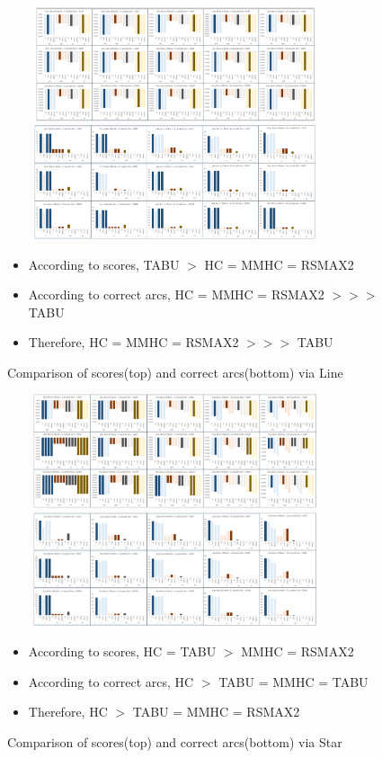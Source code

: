 \documentclass[runningheads,a4paper]{llncs}
\begin{document}
	\begin{figure}
		\centering
		\includegraphics[width=280pt, height=95pt]{images/02_Line_Score}
		\includegraphics[width=280pt, height=95pt]{images/02_Line_Arcs}
		\caption{Comparison of scores(top) and correct arcs(bottom) via Line}
		{
			\begin{itemize}
				\item According to scores, TABU $>$ HC = MMHC = RSMAX2
				
				\item According to correct arcs, HC = MMHC = RSMAX2 $>>>$ TABU
				
				\item Therefore, {\color{red}HC = MMHC = RSMAX2 $>>>$ TABU}
			\end{itemize}
		}
	\end{figure}




	\begin{figure}
		\centering
		\includegraphics[width=280pt, height=95pt]{images/03_Star_Score}
		\includegraphics[width=280pt, height=95pt]{images/03_Star_Arcs}
		\caption{Comparison of scores(top) and correct arcs(bottom) via Star}
		{
			\begin{itemize}
				\item According to scores, HC = TABU $>$ MMHC = RSMAX2
				
				\item According to correct arcs, HC $>$ TABU = MMHC = TABU
				
				\item Therefore, {\color{red}HC $>$ TABU = MMHC = RSMAX2}
			\end{itemize}
		}
	\end{figure}	
\end{document}
